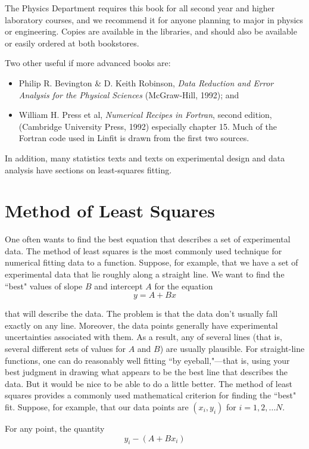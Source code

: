 The Physics Department requires this book for all second year and
higher laboratory courses, and we recommend it for anyone planning to
major in physics or engineering.  Copies are available in the libraries,
and should also be available or easily ordered at both bookstores.

Two other useful if more advanced books are:

\begin{itemize}
\item Philip R.  Bevington \& D. Keith Robinson, {\em Data Reduction and
Error Analysis for the
Physical Sciences} (McGraw-Hill, 1992); and
%
\item  William H. Press et al,
{\em Numerical Recipes in Fortran}, second edition, (Cambridge
University Press, 1992) especially chapter 15.
  Much of the Fortran
code used in Linfit is drawn from the first two sources.
\end{itemize}
In
addition, many statistics texts and texts on experimental design and
data analysis have sections on least-squares fitting.


\section*{Method of Least Squares}

One often wants to find the best equation that describes a set of
experimental data.  The method of least squares 
is the most commonly used technique for 
numerical fitting data to a function.  Suppose, for example, that we
have a set of experimental data that lie roughly along a straight
line.  We want to find the ``best" values of slope $B$ and intercept
$A$
for the equation
\[
y = A + Bx
\]

 that will describe the data.  The problem is that the
data don't usually fall exactly on any line.  Moreover,
the data points generally have experimental uncertainties
associated with them.  As a result, any of
several lines (that is, several different sets of values for $A$ and
$B$) are usually plausible.  For straight-line functions, one can do
reasonably well fitting ``by
eyeball,"---that is, using your best judgment in drawing what appears to
be the best line that describes the data.  But it would be nice
to be able to do a little better.  The method of least squares
provides
a commonly used mathematical criterion for finding the ``best" fit.
Suppose, for example, that our data points are 
$(x_i, y_i)$ for $i=1,2,\ldots N$.

For any point, the quantity
\[
y_i -(A + Bx_i)
\]

